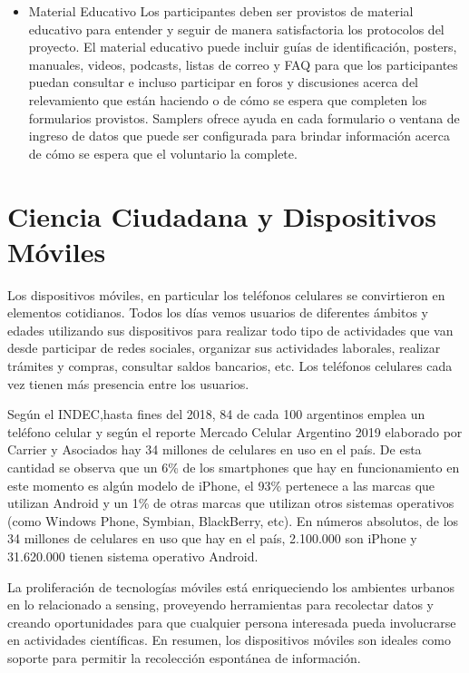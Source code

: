 \begin{itemize}
	\item {Material Educativo}
		Los participantes deben ser provistos de material educativo para entender y seguir de manera satisfactoria los protocolos del proyecto. El material educativo puede incluir guías de identificación, posters, manuales, videos, podcasts, listas de correo y FAQ para que los participantes puedan consultar e incluso participar en foros y discusiones acerca del relevamiento que están haciendo o de cómo se espera que completen los formularios provistos. 
		Samplers ofrece ayuda en cada formulario o ventana de ingreso de datos que puede ser configurada para brindar información acerca de cómo se espera que el voluntario la complete.
		
\end{itemize} 

	
\section{Ciencia Ciudadana y Dispositivos Móviles}

	Los dispositivos móviles, en particular los teléfonos celulares se convirtieron en elementos cotidianos. Todos los días vemos usuarios de diferentes ámbitos y edades utilizando sus dispositivos para realizar todo tipo de actividades que van desde participar de redes sociales, organizar sus actividades laborales, realizar trámites y compras, consultar saldos bancarios, etc. Los teléfonos celulares cada vez tienen más presencia entre los usuarios. 
	
	Según el INDEC,hasta fines del 2018, 84 de cada 100 argentinos emplea un teléfono celular \cite{INDEC} y según el reporte Mercado Celular Argentino 2019 elaborado por Carrier y Asociados hay 34 millones de celulares en uso en el país. De esta cantidad se observa que un 6\% de los smartphones que hay en funcionamiento en este momento es algún modelo de iPhone, el 93\% pertenece a las marcas que utilizan Android y un 1\% de otras marcas que utilizan otros sistemas operativos (como Windows Phone, Symbian, BlackBerry, etc). En números absolutos, de los 34 millones de celulares en uso que hay en el país, 2.100.000 son iPhone y 31.620.000 tienen sistema operativo Android. \cite{carrier}	
		
	La proliferación de tecnologías móviles está enriqueciendo los ambientes urbanos en lo relacionado a sensing, proveyendo herramientas para recolectar datos y creando oportunidades para que cualquier persona interesada pueda involucrarse en actividades científicas. En resumen, los dispositivos móviles son ideales como soporte para permitir la recolección espontánea de información. \cite{kim2013sensr}
	
